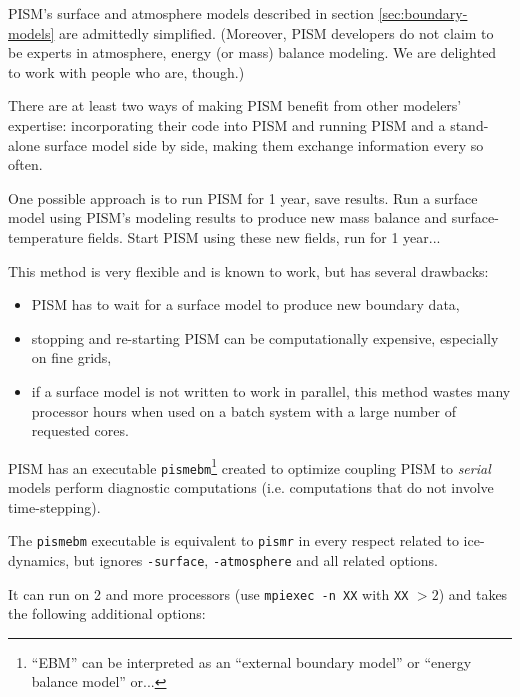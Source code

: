 PISM's surface and atmosphere models described in section
\ref{sec:boundary-models} are admittedly simplified. (Moreover, PISM developers
do not claim to be experts in atmosphere, energy (or mass) balance modeling. We
are delighted to work with people who are, though.)

There are at least two ways of making PISM benefit from other modelers'
expertise: incorporating their code into PISM and running PISM and a
stand-alone surface model side by side, making them exchange information every
so often.

One possible approach is to run PISM for 1 year, save results. Run a surface
model using PISM's modeling results to produce new mass balance and
surface-temperature fields. Start PISM using these new fields, run for 1
year...

This method is very flexible and is known to work, but has several drawbacks:
\begin{itemize}
\item PISM has to wait for a surface model to produce new boundary data,
\item stopping and re-starting PISM can be computationally expensive,
  especially on fine grids,
\item if a surface model is not written to work in parallel, this method wastes
  many processor hours when used on a batch system with a large number of
  requested cores.
\end{itemize}

PISM has an executable \texttt{pismebm}\footnote{``EBM'' can be interpreted as
  an ``external boundary model'' or ``energy balance model'' or...} created to
optimize coupling PISM to \emph{serial} models perform diagnostic computations
(i.e. computations that do not involve time-stepping).

The \texttt{pismebm} executable is equivalent to \texttt{pismr} in every respect related
to ice-dynamics, but ignores \texttt{-surface}, \texttt{-atmosphere} and all
related options.

It can run on 2 and more processors (use \texttt{mpiexec -n XX} with
\texttt{XX} $> 2$) and takes the following additional options:

